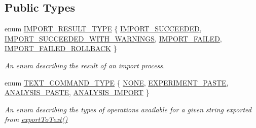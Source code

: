 \subsection*{Public Types}
\begin{DoxyCompactItemize}
\item 
enum \hyperlink{class_asset_export_import_aca4cd77d57caadb60bc50edc33ca3d9e}{I\-M\-P\-O\-R\-T\-\_\-\-R\-E\-S\-U\-L\-T\-\_\-\-T\-Y\-P\-E} \{ \hyperlink{class_asset_export_import_aca4cd77d57caadb60bc50edc33ca3d9eafb1638381aef4aee18f93d3479c8d504}{I\-M\-P\-O\-R\-T\-\_\-\-S\-U\-C\-C\-E\-E\-D\-E\-D}, 
\hyperlink{class_asset_export_import_aca4cd77d57caadb60bc50edc33ca3d9ea1e2b2370e45bb6dfde584f190eb49d4f}{I\-M\-P\-O\-R\-T\-\_\-\-S\-U\-C\-C\-E\-E\-D\-E\-D\-\_\-\-W\-I\-T\-H\-\_\-\-W\-A\-R\-N\-I\-N\-G\-S}, 
\hyperlink{class_asset_export_import_aca4cd77d57caadb60bc50edc33ca3d9ea46133e570ffe748afb4af35dae1a7269}{I\-M\-P\-O\-R\-T\-\_\-\-F\-A\-I\-L\-E\-D}, 
\hyperlink{class_asset_export_import_aca4cd77d57caadb60bc50edc33ca3d9ead8177ff757d543d6b6f3d9ca8d5dddbf}{I\-M\-P\-O\-R\-T\-\_\-\-F\-A\-I\-L\-E\-D\-\_\-\-R\-O\-L\-L\-B\-A\-C\-K}
 \}
\begin{DoxyCompactList}\small\item\em An enum describing the result of an import process. \end{DoxyCompactList}\item 
enum \hyperlink{class_asset_export_import_a37d3ee8f821ba2e32f16705c7c471d7e}{T\-E\-X\-T\-\_\-\-C\-O\-M\-M\-A\-N\-D\-\_\-\-T\-Y\-P\-E} \{ \hyperlink{class_asset_export_import_a37d3ee8f821ba2e32f16705c7c471d7ea8ca1e74bed20219f29294423473af44e}{N\-O\-N\-E}, 
\hyperlink{class_asset_export_import_a37d3ee8f821ba2e32f16705c7c471d7eae0569d127f144681bd278c5608acfca3}{E\-X\-P\-E\-R\-I\-M\-E\-N\-T\-\_\-\-P\-A\-S\-T\-E}, 
\hyperlink{class_asset_export_import_a37d3ee8f821ba2e32f16705c7c471d7ea256f385a864cc065545ab659f8f728b1}{A\-N\-A\-L\-Y\-S\-I\-S\-\_\-\-P\-A\-S\-T\-E}, 
\hyperlink{class_asset_export_import_a37d3ee8f821ba2e32f16705c7c471d7eaa760024a586e0f4925aba0d4f6eb3808}{A\-N\-A\-L\-Y\-S\-I\-S\-\_\-\-I\-M\-P\-O\-R\-T}
 \}
\begin{DoxyCompactList}\small\item\em An enum describing the types of operations available for a given string exported from \hyperlink{class_asset_export_import_a164a5810ba088a4577ecb5e7b81a12ef}{export\-To\-Text()} \end{DoxyCompactList}\end{DoxyCompactItemize}
